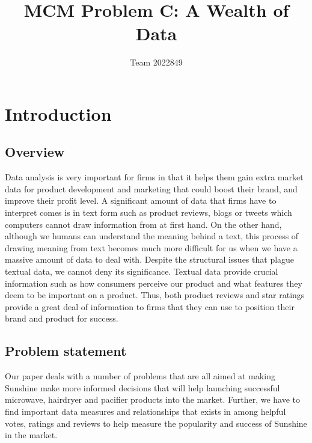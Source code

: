 \documentclass[reqno]{article}
\theoremstyle{definition}
\theoremstyle{definition}
\theoremstyle{remark}
\begin{document}


\title{MCM Problem C: A Wealth of Data}
\author{Team 2022849}
\maketitle

\tableofcontents
{}
\newpage
\section{Introduction}
\subsection{Overview} Data analysis is very important for firms in that it helps them gain extra market data for product development and marketing that could boost their brand, and improve their profit level. A significant amount of data that firms have to interpret comes is in text form such as product reviews, blogs or tweets which computers cannot draw information from at first hand. On the other hand, although we humans can understand the meaning behind a text, this process of drawing meaning from text becomes much more difficult for us when we have a massive amount of data to deal with. Despite the structural issues that plague textual data, we cannot deny its significance. Textual data provide crucial information such as how consumers perceive our product and what features they deem to be important on a product. Thus, both product reviews and star ratings provide a great deal of information to firms that they can use to position their brand and product for success.
\subsection{Problem statement}
Our paper deals with a number of problems that are all aimed at making Sunshine make more informed decisions that will help  launching successful microwave, hairdryer and pacifier products into the market. Further, we have to find important data measures and relationships that exists in among helpful votes, ratings and reviews to help measure the popularity and success of Sunshine in the market.
\end{document}
